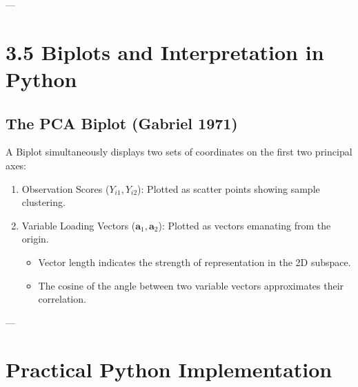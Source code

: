 \documentclass[
]{article}
\begin{document}
---

\textbf{ }

\section{3.5 Biplots and Interpretation in Python}

\textbf{ }

\subsection{The PCA Biplot (Gabriel 1971)}

A Biplot simultaneously displays two sets of coordinates on the first
two principal axes:

\begin{enumerate}
\item
  \textbf{}Observation Scores (\(Y_{i1},Y_{i2}\)):\textbf{} Plotted as
  scatter points showing sample clustering.
\item
  \textbf{}Variable Loading Vectors
  (\(\mathbf{a}_{1},\mathbf{a}_{2}\)):\textbf{} Plotted as vectors
  emanating from the origin.

  \begin{itemize}
  \item
    Vector length indicates the strength of representation in the 2D
    subspace.
  \item
    The cosine of the angle between two variable vectors approximates
    their correlation.
  \end{itemize}
\end{enumerate}

---

\textbf{ }

\section{Practical Python Implementation}
\end{document}

